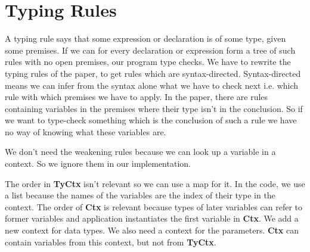 \documentclass[a4paper,cleardoubleempty,BCOR1cm]{scrbook}
\begin{document}
\section{Typing Rules}
\label{sec:org6e586ab}
A typing rule says that some expression or declaration is of some type, given
some premises. If we can for every declaration or expression form a tree of
such rules with no open premises, our program type checks. We have to rewrite
the typing rules of the paper, to get rules which are syntax-directed.
Syntax-directed means we can infer from the syntax alone what we have to check next
i.e. which rule with which premises we have to apply. In the paper, there are
rules containing variables in the premises where their type isn't in the
conclusion. So if we want to type-check something which is the conclusion of
such a rule we have no way of knowing what these variables are.

We don't need the weakening rules because we can look up a variable in a
context.  So we ignore them in our implementation.

The order in \textbf{TyCtx} isn't relevant so we can use a map for it. In the code, we
use a list because the names of the variables are the index of their type in
the context. The order of \textbf{Ctx} is relevant because types of later variables
can refer to former variables and application instantiates the first variable
in \textbf{Ctx}. We add a new context for data types. We also need a context for the
parameters. \textbf{Ctx} can contain variables from this context, but not from
\textbf{TyCtx}.
\end{document}
